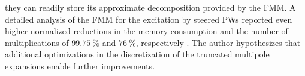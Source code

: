 they can readily store
its approximate decomposition provided by
the \ac{FMM}.
A detailed analysis of
the \ac{FMM} for
the excitation by
steered \acp{PW} reported
even higher normalized reductions in
the memory consumption and
the number of
multiplications of
$\SI{99.75}{\percent}$ and
$\SI{76}{\percent}$,
respectively
\cite{proc:SchiffnerIUS2014}.
The author hypothesizes that
additional optimizations in
the discretization of
the truncated multipole expansions enable
further improvements.


